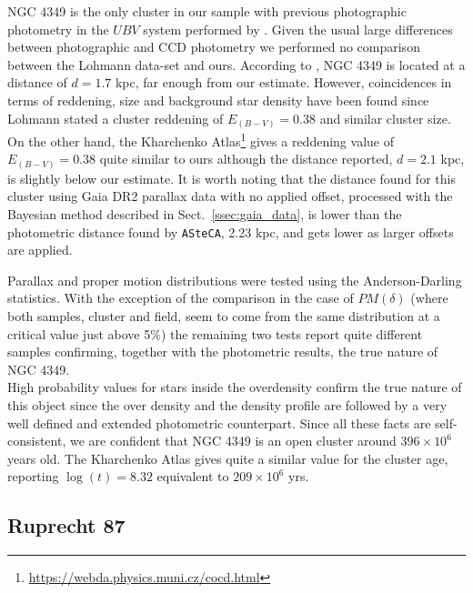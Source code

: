 \documentclass[draft]{aa}
\begin{document}
NGC 4349 is the only cluster in our sample with previous photographic photometry
in the $UBV$ system performed by \cite{Lohmann_1961}. Given the usual large
differences between photographic and CCD photometry we performed no comparison
between the Lohmann data-set and ours. According to \cite{Lohmann_1961}, NGC
4349 is located at a distance of $d=1.7$ kpc, far enough from our estimate.
However, coincidences in terms of reddening, size and background star density
have been found since Lohmann stated a cluster reddening of $E_{(B-V)}=0.38$
and similar cluster size. On the other hand, the Kharchenko
Atlas\footnote{\url{https://webda.physics.muni.cz/cocd.html}}
\citep{Kharchenko_2005} gives a reddening value of $E_{(B-V)} = 0.38$ quite
similar to ours although the distance reported, $d=2.1$ kpc, is slightly below
our estimate.
It is worth noting that the distance found for this cluster using Gaia DR2
parallax data with no applied offset, processed with the Bayesian method
described in Sect.~\ref{ssec:gaia_data}, is lower than the photometric
distance found by \texttt{ASteCA}, 2.23 kpc, and gets lower as larger offsets
are applied.

Parallax and proper motion distributions were tested using the Anderson-Darling
statistics. With the exception of the comparison in the case of $PM(\delta)$
(where both samples, cluster and field, seem to come from the same distribution
at a critical value just above 5\%) the remaining two tests report quite
different samples confirming, together with the photometric results, the true
nature of NGC 4349.\\

High probability values for stars inside the overdensity confirm the
true nature of this object since the over density and the density profile
are followed by a very well defined and extended photometric counterpart.
Since all these facts are self-consistent, we are confident that NGC 4349 is
an open cluster around $396\times10^6$ years old.
The Kharchenko Atlas gives quite a similar value for the cluster age, reporting
$\log(t)=8.32$ equivalent to $209\times10^6$ yrs.



\subsection{Ruprecht 87}
\end{document}
